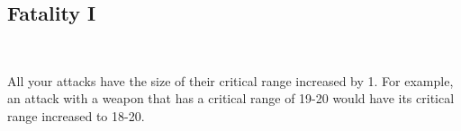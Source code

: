 \subsection*{Fatality I}\label{feat:fatality1}
 \\

%
%
%
%
%

All your attacks have the size of their critical range increased by 1. For
example, an attack with a weapon that has a critical range of 19-20 would have
its critical range increased to 18-20.
